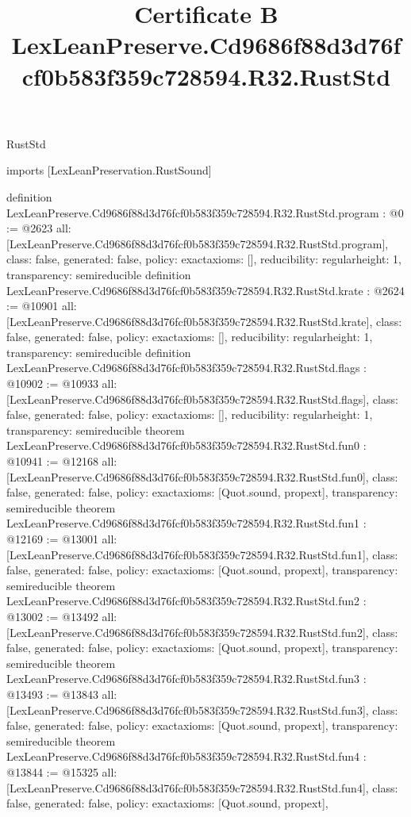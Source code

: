 \begin{lexlean}{RustStd}
\title{Certificate B LexLeanPreserve.Cd9686f88d3d76fcf0b583f359c728594.R32.RustStd}
\begin{coremodule}
imports [LexLeanPreservation.RustSound]

definition LexLeanPreserve.Cd9686f88d3d76fcf0b583f359c728594.R32.RustStd.program : @0 := @2623 {
  all: [LexLeanPreserve.Cd9686f88d3d76fcf0b583f359c728594.R32.RustStd.program],
  class: false,
  generated: false,
  policy: exact{axioms: []},
  reducibility: regular{height: 1},
  transparency: semireducible
}
definition LexLeanPreserve.Cd9686f88d3d76fcf0b583f359c728594.R32.RustStd.krate : @2624 := @10901 {
  all: [LexLeanPreserve.Cd9686f88d3d76fcf0b583f359c728594.R32.RustStd.krate],
  class: false,
  generated: false,
  policy: exact{axioms: []},
  reducibility: regular{height: 1},
  transparency: semireducible
}
definition LexLeanPreserve.Cd9686f88d3d76fcf0b583f359c728594.R32.RustStd.flags : @10902 := @10933 {
  all: [LexLeanPreserve.Cd9686f88d3d76fcf0b583f359c728594.R32.RustStd.flags],
  class: false,
  generated: false,
  policy: exact{axioms: []},
  reducibility: regular{height: 1},
  transparency: semireducible
}
theorem LexLeanPreserve.Cd9686f88d3d76fcf0b583f359c728594.R32.RustStd.fun0 : @10941 := @12168 {
  all: [LexLeanPreserve.Cd9686f88d3d76fcf0b583f359c728594.R32.RustStd.fun0],
  class: false,
  generated: false,
  policy: exact{axioms: [Quot.sound, propext]},
  transparency: semireducible
}
theorem LexLeanPreserve.Cd9686f88d3d76fcf0b583f359c728594.R32.RustStd.fun1 : @12169 := @13001 {
  all: [LexLeanPreserve.Cd9686f88d3d76fcf0b583f359c728594.R32.RustStd.fun1],
  class: false,
  generated: false,
  policy: exact{axioms: [Quot.sound, propext]},
  transparency: semireducible
}
theorem LexLeanPreserve.Cd9686f88d3d76fcf0b583f359c728594.R32.RustStd.fun2 : @13002 := @13492 {
  all: [LexLeanPreserve.Cd9686f88d3d76fcf0b583f359c728594.R32.RustStd.fun2],
  class: false,
  generated: false,
  policy: exact{axioms: [Quot.sound, propext]},
  transparency: semireducible
}
theorem LexLeanPreserve.Cd9686f88d3d76fcf0b583f359c728594.R32.RustStd.fun3 : @13493 := @13843 {
  all: [LexLeanPreserve.Cd9686f88d3d76fcf0b583f359c728594.R32.RustStd.fun3],
  class: false,
  generated: false,
  policy: exact{axioms: [Quot.sound, propext]},
  transparency: semireducible
}
theorem LexLeanPreserve.Cd9686f88d3d76fcf0b583f359c728594.R32.RustStd.fun4 : @13844 := @15325 {
  all: [LexLeanPreserve.Cd9686f88d3d76fcf0b583f359c728594.R32.RustStd.fun4],
  class: false,
  generated: false,
  policy: exact{axioms: [Quot.sound, propext]},
}
\end{coremodule}
\end{lexlean}
